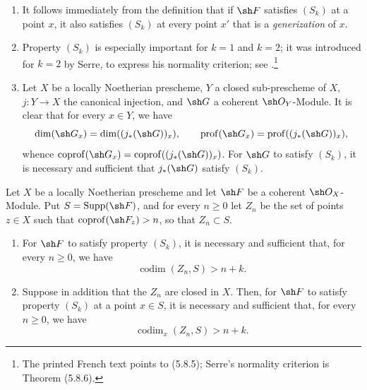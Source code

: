 \begin{remarks}[5.7.3]
\begin{enumerate}[{\rm(i)}]
\item
{}
\label{IV.5.7.3.iv}
It follows immediately from the definition that if $\sh F$
satisfies $(S_k)$ at a point $x$, it also satisfies $(S_k)$ at every point
$x'$ that is a \emph{generization} of $x$.

\item
{}
\label{IV.5.7.3.v}
Property $(S_k)$ is especially important for $k=1$ and $k=2$; it was
introduced for $k=2$ by Serre, to express his normality
criterion; see .\footnote{The printed French text points to
\textup{(5.8.5)}; Serre's normality criterion is Theorem
\textup{(5.8.6)}.}

\item
{}
\label{IV.5.7.3.vi}
Let $X$ be a locally Noetherian prescheme, $Y$ a closed sub-prescheme
of $X$, $j:Y\to X$ the canonical injection, and $\sh G$ a coherent
$\sh O_Y$-Module.  It is clear that for every $x\in Y$, we have
\[
\dim(\sh G_x)=\dim((j_*(\sh G))_x),\qquad
\operatorname{prof}(\sh G_x)
 =\operatorname{prof}((j_*(\sh G))_x),
\]
whence $\operatorname{coprof}(\sh G_x)
=\operatorname{coprof}((j_*(\sh G))_x)$.
For $\sh G$ to satisfy $(S_k)$, it is necessary and sufficient that
$j_*(\sh G)$ satisfy $(S_k)$.
\end{enumerate}
\end{remarks}

\begin{proposition}[5.7.4]
\label{IV.5.7.4}
Let $X$ be a locally Noetherian prescheme and let $\sh F$ be a
coherent $\sh O_X$-Module.  Put
$S=\operatorname{Supp}(\sh F)$, and for every $n\geq0$ let $Z_n$ be
the set of points $z\in X$ such that
$\operatorname{coprof}(\sh F_z)>n$, so that $Z_n\subset S$.
\begin{enumerate}[{\rm(i)}]
\item
{}
\label{IV.5.7.4.i}
For $\sh F$ to satisfy property $(S_k)$, it is necessary and sufficient
that, for every $n\geq0$, we have
\begin{equation}
\operatorname{codim}(Z_n,S)>n+k.
\tag{5.7.4.1}\label{IV.5.7.4.1}
\end{equation}

\item
{}
\label{IV.5.7.4.ii}
Suppose in addition that the $Z_n$ are closed in $X$.  Then, for
$\sh F$ to satisfy property $(S_k)$ at a point $x\in S$, it is necessary
and sufficient that, for every $n\geq0$, we have
\begin{equation}
\operatorname{codim}_x(Z_n,S)>n+k.
\tag{5.7.4.2}\label{IV.5.7.4.2}
\end{equation}
\end{enumerate}
\end{proposition}

